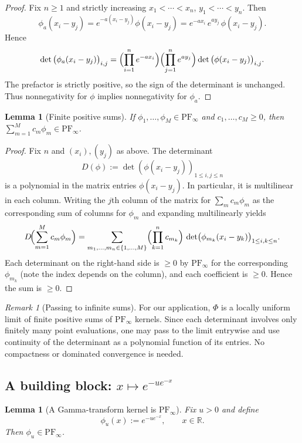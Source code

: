 \documentclass[12pt]{amsart}
\newtheorem{lemma}[theorem]{Lemma}
\theoremstyle{definition}
\theoremstyle{remark}
\newtheorem{remark}[theorem]{Remark}
\begin{document}
\begin{proof}
Fix $n\ge1$ and strictly increasing $x_1<\cdots<x_n$, $y_1<\cdots<y_n$.
Then
\[
\phi_a(x_i-y_j)=e^{-a(x_i-y_j)}\phi(x_i-y_j)=e^{-a x_i}\,e^{a y_j}\,\phi(x_i-y_j).
\]
Hence
\[
\det\big(\phi_a(x_i-y_j)\big)_{i,j}
=
\Bigl(\prod_{i=1}^n e^{-a x_i}\Bigr)
\Bigl(\prod_{j=1}^n e^{a y_j}\Bigr)
\det\big(\phi(x_i-y_j)\big)_{i,j}.
\]
The prefactor is strictly positive, so the sign of the determinant is unchanged.
Thus nonnegativity for $\phi$ implies nonnegativity for $\phi_a$.
\end{proof}

\begin{lemma}[Finite positive sums]
\label{lem:PF-sums}
If $\phi_1,\dots,\phi_M\in\mathrm{PF}_\infty$ and $c_1,\dots,c_M\ge0$, then
$\sum_{m=1}^M c_m\phi_m\in\mathrm{PF}_\infty$.
\end{lemma}

\begin{proof}
Fix $n$ and $(x_i),(y_j)$ as above. The determinant
\[
D(\phi):=\det(\phi(x_i-y_j))_{1\le i,j\le n}
\]
is a polynomial in the matrix entries $\phi(x_i-y_j)$. In particular, it is
multilinear in each column. Writing the $j$th column of the matrix for
$\sum_{m}c_m\phi_m$ as the corresponding sum of columns for $\phi_m$ and expanding
multilinearly yields
\[
D\!\Bigl(\sum_{m=1}^M c_m\phi_m\Bigr)
=
\sum_{m_1,\dots,m_n\in\{1,\dots,M\}}
\Bigl(\prod_{k=1}^n c_{m_k}\Bigr)\,
\det\!\big(\phi_{m_k}(x_i-y_k)\big)_{1\le i,k\le n}.
\]
Each determinant on the right-hand side is $\ge0$ by $\mathrm{PF}_\infty$ for the
corresponding $\phi_{m_k}$ (note the index depends on the column), and each coefficient
is $\ge0$. Hence the sum is $\ge0$.
\end{proof}

\begin{remark}[Passing to infinite sums]
For our application, $\Phi$ is a locally uniform limit of finite positive sums of
$\mathrm{PF}_\infty$ kernels. Since each determinant involves only finitely many point
evaluations, one may pass to the limit entrywise and use continuity of the determinant
as a polynomial function of its entries. No compactness or dominated convergence is needed.
\end{remark}

\subsection{A building block: $x\mapsto e^{-u e^{-x}}$}

\begin{lemma}[A Gamma-transform kernel is $\mathrm{PF}_\infty$]
\label{lem:gamma-kernel-PF}
Fix $u>0$ and define
\[
\phi_u(x):=e^{-u e^{-x}},\qquad x\in\mathbb R.
\]
Then $\phi_u\in\mathrm{PF}_\infty$.
\end{lemma}
\end{document}
